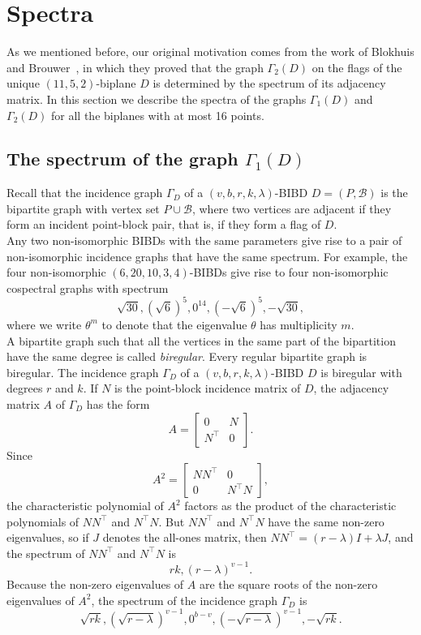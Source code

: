 \documentclass[letterpaper,10pt]{article}
\theoremstyle{plain}
\theoremstyle{definition}
\begin{document}
\section{Spectra}\label{sp}
As we mentioned before, our original motivation comes from the work of Blokhuis and Brouwer~\cite{BB}, in which they proved that the graph $\Gamma_2(D)$ on the flags of the unique $(11,5,2)$-biplane $D$ is determined by the spectrum of its adjacency matrix. 
In this section we describe the spectra of the graphs $\Gamma_1(D)$ and $\Gamma_2(D)$ for all the biplanes with at most 16 points. 


\subsection{The spectrum of the graph $\Gamma_1(D)$}

 
Recall that the incidence graph $\Gamma_D$ of a $(v,b,r,k,\lambda)$-BIBD $D = (P,\mathcal{B})$ is the bipartite  graph with vertex set $P\cup\mathcal{B}$, where two vertices are adjacent if they form an incident point-block pair, that is,  if they form a flag of $D$. \\

Any two non-isomorphic BIBDs with the same parameters give rise to a pair of non-isomorphic incidence graphs that have the same spectrum. 
For example, the four non-isomorphic $(6,20,10,3,4)$-BIBDs give rise to four non-isomorphic cospectral  graphs  with spectrum
\[
\sqrt{30}, (\sqrt{6})^5, 0^{14}, (-\sqrt{6})^5, -\sqrt{30},
\]
where we write $\theta^m$ to denote that the eigenvalue  $\theta$ has multiplicity $m$. 
\\

A bipartite graph such that all the vertices in the same part of the bipartition have the same degree is called \emph{biregular}. 
Every regular bipartite graph is biregular. 
The incidence graph $\Gamma_D$ of a $(v,b,r,k,\lambda)$-BIBD $D$ is biregular with degrees $r$ and $k$.
If $N$ is the point-block incidence matrix of  $D$, the adjacency matrix $A$ of $\Gamma_D$ has the form
\[
A = 
\begin{bmatrix}
0 & N\\
N^\top & 0
\end{bmatrix}.
\]
Since 
\[
A^2 = 
\begin{bmatrix}
NN^\top & 0\\
0 & N^\top N
\end{bmatrix},
\]
the characteristic polynomial of $A^2$ factors as the product of the characteristic polynomials of $NN^\top$ and  $N^\top N$. 
But $NN^\top$ and  $N^\top N$ have the same non-zero eigenvalues, so if $J$ denotes the all-ones matrix, then $NN^\top =(r-\lambda)I + \lambda J$, and the spectrum of $NN^\top$ and $N^\top N$ is 
\[
rk, (r-\lambda)^{v-1}.
\]
Because the non-zero eigenvalues of $A$ are  the square roots of the non-zero eigenvalues of $A^2$, the spectrum of the incidence graph $\Gamma_D$ is  
\[
\sqrt{rk}, (\sqrt{r-\lambda})^{v-1}, 0^{b-v}, (-\sqrt{r-\lambda})^{v-1}, -\sqrt{rk}.
\]\\
\end{document}
